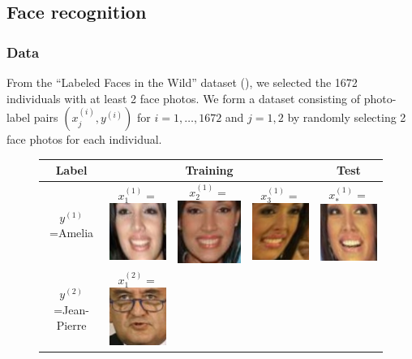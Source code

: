 \documentclass[twoside,11pt]{article}
\begin{document}
\subsection{Face recognition}

\subsubsection*{Data}
From the ``Labeled Faces in the Wild'' dataset (\cite{LFWTech}), we
selected the 1672 individuals with at least 2 face photos.  We form a
dataset consisting of photo-label pairs $(x_j^{(i)}, y^{(i)})$
for $i = 1,\hdots, 1672$ and $j = 1,2$ by randomly selecting 2 face
photos for each individual. 

\begin{figure}
\centering
\begin{tabular}{|c|ccc|c|}
\hline
Label & & Training & & Test\\ \hline
$y^{(1)}$=Amelia & 
  $x_1^{(1)} = $\includegraphics[scale = 0.2]{face_photos/Amelia_Vega_0001.png} &  
  $x_2^{(1)} = $\includegraphics[scale = 0.2]{face_photos/Amelia_Vega_0002.png} &  
  $x_3^{(1)} = $\includegraphics[scale = 0.2]{face_photos/Amelia_Vega_0003.png} &  
  $x_*^{(1)} = $\includegraphics[scale = 0.2]{face_photos/Amelia_Vega_0004.png} \\ \hline
$y^{(2)}$=Jean-Pierre & 
  $x_1^{(2)} = $\includegraphics[scale = 0.2]{face_photos/Jean-Pierre_Raffarin_0001.png} &  

\end{tabular}
\end{figure}
\end{document}
